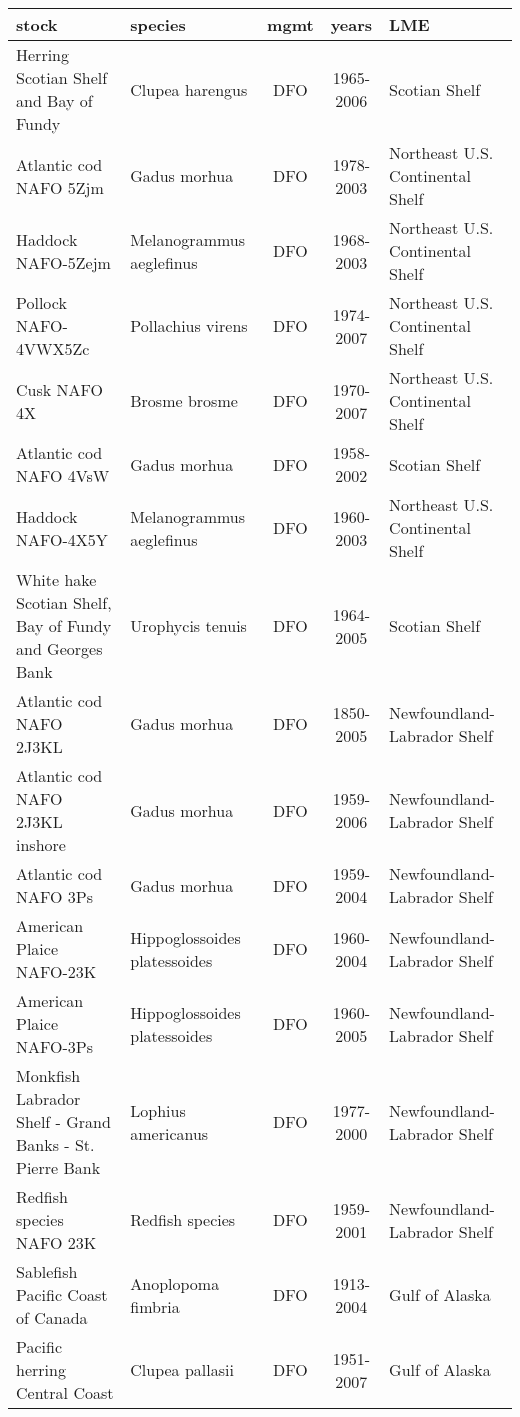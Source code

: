 \begin{longtable}{p{4cm}p{3.5cm}ccp{5.5cm}}
  \hline
stock & species & mgmt & years & LME \\ 
  \hline
Herring Scotian Shelf and Bay of Fundy & Clupea harengus & DFO & 1965-2006 & Scotian Shelf \\ 
  Atlantic cod NAFO 5Zjm & Gadus morhua & DFO & 1978-2003 & Northeast U.S. Continental Shelf \\ 
  Haddock NAFO-5Zejm & Melanogrammus aeglefinus & DFO & 1968-2003 & Northeast U.S. Continental Shelf \\ 
  Pollock NAFO-4VWX5Zc & Pollachius virens & DFO & 1974-2007 & Northeast U.S. Continental Shelf \\ 
  Cusk NAFO 4X & Brosme brosme & DFO & 1970-2007 & Northeast U.S. Continental Shelf \\ 
  Atlantic cod NAFO 4VsW & Gadus morhua & DFO & 1958-2002 & Scotian Shelf \\ 
  Haddock NAFO-4X5Y & Melanogrammus aeglefinus & DFO & 1960-2003 & Northeast U.S. Continental Shelf \\ 
  White hake Scotian Shelf, Bay of Fundy and Georges Bank & Urophycis tenuis & DFO & 1964-2005 & Scotian Shelf \\ 
  Atlantic cod NAFO 2J3KL & Gadus morhua & DFO & 1850-2005 & Newfoundland-Labrador Shelf \\ 
  Atlantic cod NAFO 2J3KL inshore & Gadus morhua & DFO & 1959-2006 & Newfoundland-Labrador Shelf \\ 
  Atlantic cod NAFO 3Ps & Gadus morhua & DFO & 1959-2004 & Newfoundland-Labrador Shelf \\ 
  American Plaice NAFO-23K & Hippoglossoides platessoides & DFO & 1960-2004 & Newfoundland-Labrador Shelf \\ 
  American Plaice NAFO-3Ps & Hippoglossoides platessoides & DFO & 1960-2005 & Newfoundland-Labrador Shelf \\ 
  Monkfish Labrador Shelf - Grand Banks - St. Pierre Bank & Lophius americanus & DFO & 1977-2000 & Newfoundland-Labrador Shelf \\ 
  Redfish species NAFO 23K & Redfish species & DFO & 1959-2001 & Newfoundland-Labrador Shelf \\ 
  Sablefish Pacific Coast of Canada & Anoplopoma fimbria & DFO & 1913-2004 & Gulf of Alaska \\ 
  Pacific herring Central Coast & Clupea pallasii & DFO & 1951-2007 & Gulf of Alaska \\ 

\end{longtable}
